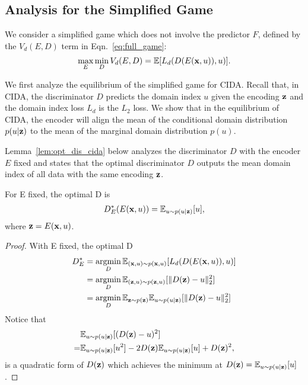 \documentclass{article}
\newcommand{\lemref}[1]{Lemma~\ref{#1}}
\newcommand{\eqnref}[1]{Eqn.~\ref{#1}}
\begin{document}
\subsection{Analysis for the Simplified Game}
We consider a simplified game which does not involve the predictor $F$, defined by the $V_d(E,D)$ term in \eqnref{eq:full_game}:
\begin{align}
\max\limits_{E} \min \limits_D V_d(E,D) = \mathbb{E} [L_d( D(E({\bf x}, u)),u)]. \label{eq:simplified_game}
\end{align}

We first analyze the equilibrium of the simplified game for CIDA.
Recall that, in CIDA, the discriminator $D$ predicts the domain index $u$ given the encoding ${\bf z}$ and the domain index loss $L_d$ is the $L_2$ loss. We show that in the equilibrium of CIDA, the encoder will align the mean of the conditional domain distribution $p(u|{\bf z})$ to the mean of the marginal domain distribution $p(u)$.

\lemref{lem:opt_dis_cida} below analyzes the discriminator $D$ with the encoder $E$ fixed and states that the optimal discriminator $D$ outputs the mean domain index of all data with the same encoding ${\bf z}$. 
\begin{lemma}\label{lem:opt_dis_cida}
For E fixed, the optimal D is
\begin{align*}
D^*_{E}(E({\bf x},u)) = \mathbb{E}_{u\sim p(u | {\bf z})} [u],
\end{align*}
where ${\bf z}=E({\bf x},u)$.
\end{lemma}
\begin{proof}
With E fixed, the optimal D
\begin{align*}
D^*_{E} &= \mathop{\rm argmin}\limits_{D} \mathbb{E}_{({\bf x},u)\sim p({\bf x},u)} [L_d(D(E({\bf x}, u)),u)]\\
&= \mathop{\rm argmin}\limits_{D} \mathbb{E}_{({\bf z},u)\sim p({\bf z},u)} [\|D({\bf z})-u\|_2^2]\\
&=\mathop{\rm argmin}\limits_{D} \mathbb{E}_{{\bf z}\sim p({\bf z})} \mathbb{E}_{u\sim p(u | {\bf z})}[\|D({\bf z})-u\|_2^2]
\end{align*}
Notice that
\begin{align*}
&\mathbb{E}_{u\sim p(u | {\bf z})}[(D({\bf z}) - u)^2] \\ =&\mathbb{E}_{u\sim p(u | {\bf z})}[u^2] - 2D({\bf z})\mathbb{E}_{u\sim p(u | {\bf z})}[u] + D({\bf z})^2,
\end{align*}
is a quadratic form of $D({\bf z})$ which achieves the minimum at $D({\bf z})=\mathbb{E}_{u\sim p(u | {\bf z})}[u]$.
\end{proof}
\end{document}
